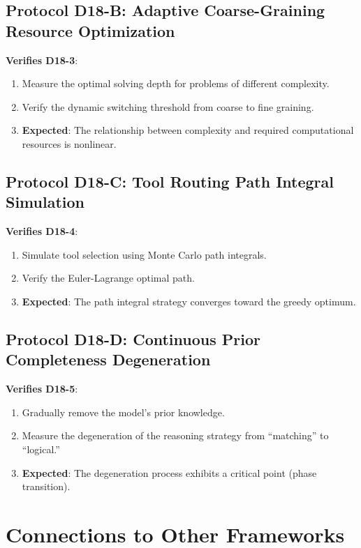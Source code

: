 \documentclass[12pt, a4paper]{article}
\begin{document}
\subsection{Protocol D18-B: Adaptive Coarse-Graining Resource Optimization}

\textbf{Verifies D18-3}:
\begin{enumerate}
\item Measure the optimal solving depth for problems of different complexity.
\item Verify the dynamic switching threshold from coarse to fine graining.
\item \textbf{Expected}: The relationship between complexity and required computational resources is nonlinear.
\end{enumerate}

\subsection{Protocol D18-C: Tool Routing Path Integral Simulation}

\textbf{Verifies D18-4}:
\begin{enumerate}
\item Simulate tool selection using Monte Carlo path integrals.
\item Verify the Euler-Lagrange optimal path.
\item \textbf{Expected}: The path integral strategy converges toward the greedy optimum.
\end{enumerate}

\subsection{Protocol D18-D: Continuous Prior Completeness Degeneration}

\textbf{Verifies D18-5}:
\begin{enumerate}
\item Gradually remove the model's prior knowledge.
\item Measure the degeneration of the reasoning strategy from ``matching'' to ``logical.''
\item \textbf{Expected}: The degeneration process exhibits a critical point (phase transition).
\end{enumerate}

\section{Connections to Other Frameworks}
\end{document}
